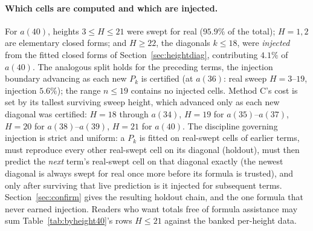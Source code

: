\documentclass[11pt]{article}
\begin{document}
\paragraph{Which cells are computed and which are injected.}
For $a(40)$, heights $3\le H\le21$ were swept for real ($95.9\%$ of the total);
$H=1,2$ are elementary closed forms; and $H\ge22$, the diagonals
$k\le18$, were \emph{injected} from the fitted closed forms of
Section~\ref{sec:heightdiag}, contributing $4.1\%$ of $a(40)$. The
analogous split holds for the preceding terms, the injection boundary
advancing as each new $P_k$ is certified (at $a(36)$: real sweep
$H\!=\!3$--$19$, injection $5.6\%$); the range $n\le19$ contains no
injected cells. Method C's cost is set by its tallest surviving
sweep height, which advanced only as each new diagonal was certified:
$H=18$ through $a(34)$, $H=19$ for $a(35)$--$a(37)$, $H=20$ for
$a(38)$--$a(39)$, $H=21$ for $a(40)$. The discipline governing injection is strict and
uniform: a $P_k$ is fitted on real-swept cells of earlier terms, must
reproduce every other real-swept cell on its diagonal (holdout), must then
predict the \emph{next} term's real-swept cell on that diagonal
exactly (the newest diagonal is always swept for real once more before its
formula is trusted), and only after surviving that live prediction is it
injected for subsequent terms. Section~\ref{sec:confirm} gives the
resulting holdout chain, and the one formula that never earned injection.
Readers who want totals free of formula assistance may sum
Table~\ref{tab:byheight40}'s rows $H\le21$ against the banked per-height
data.
\end{document}
